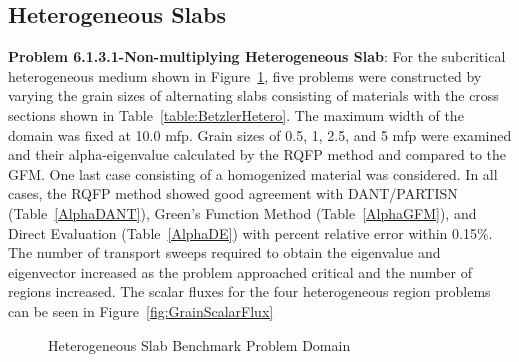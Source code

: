 \clearpage
\subsection{Heterogeneous Slabs}

\textbf{Problem 6.1.3.1-Non-multiplying Heterogeneous Slab}: For the subcritical heterogeneous medium shown in Figure~\ref{fig:HeteroSlabDomain}, five problems were constructed by varying the grain sizes of alternating slabs consisting of materials with the cross sections shown in Table~\ref{table:BetzlerHetero}. The maximum width of the domain was fixed at 10.0 mfp. Grain sizes of 0.5, 1, 2.5, and 5 mfp were examined and their alpha-eigenvalue calculated by the RQFP method and compared to the GFM. One last case consisting of a homogenized material was considered. In all cases, the RQFP method showed good agreement with DANT/PARTISN (Table~\ref{AlphaDANT}), Green's Function Method (Table~\ref{AlphaGFM}), and Direct Evaluation (Table~\ref{AlphaDE}) with percent relative error within 0.15\%. The number of transport sweeps required to obtain the eigenvalue and eigenvector increased as the problem approached critical and the number of regions increased. The scalar fluxes for the four heterogeneous region problems can be seen in Figure~\ref{fig:GrainScalarFlux}

\begin{figure}[!htbp]
	\centering
	
	\caption{Heterogeneous Slab Benchmark Problem Domain \cite{kornreich_timeeigenvalue_2005}}
	\label{fig:HeteroSlabDomain}
\end{figure}

